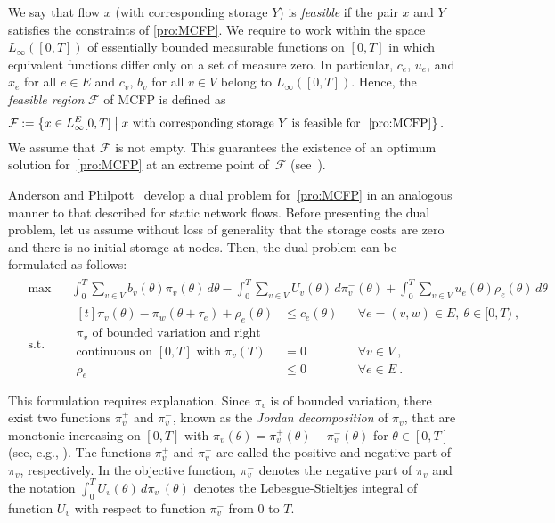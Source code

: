 \documentclass{svjour3}                     \smartqed
\begin{document}
We say that flow $x$ (with corresponding storage $Y$) is \emph{feasible} if the pair $x$ and $Y$ satisfies the constraints of \eqref{pro:MCFP}.
We require to work within the space $L_\infty([0,T])$ of essentially bounded measurable functions on $[0,T]$ in which equivalent functions differ only on a set of measure zero. In particular, $c_e$, $u_e$, and $x_e$ for all $e\in E$ and $c_v$, $b_v$ for all $v\in V$ belong to $L_\infty([0,T])$. Hence, the {\em feasible region} $\mathcal{F}$ of MCFP is defined as
\begin{align*}
\mathcal{F}&:=\left\{x\in L_\infty^{E}[0,T] \;\big|\; \text{$x$ with corresponding storage $Y$ is feasible for ~\eqref{pro:MCFP}} \right\}.
\end{align*}
We assume that $\mathcal{F}$ is not empty. This guarantees the existence of an optimum solution for~\eqref{pro:MCFP} at an
extreme point of~$\mathcal{F}$ (see~\cite[Theorem 3.1]{Pullan97}).


Anderson and Philpott~\cite{AndersonPhilpott94} develop a dual problem for~\eqref{pro:MCFP} in an analogous manner to that described for static network flows. Before presenting the dual problem, let us assume without loss of generality that the storage costs are zero and there is no initial storage at nodes. Then, the dual problem can be formulated as follows:
\begin{align}
\label{pro:MCFP*}
\tag{MCFP$^*$}
  \begin{aligned}
    &\max && \int_{0}^{T}\sum_{v\in V}b_v(\theta)\pi_v(\theta)\,d\theta-\int_{0}^{T}\sum_{v\in V}{U_v(\theta)\,d\pi_v^{-}(\theta)}+\int_{0}^{T}\sum_{v\in V}{u_e(\theta)\rho_e(\theta)}\,d\theta\\
    &\text{s.t.}
      &&\begin{aligned}[t]
        \pi_{v}(\theta)-\pi_w(\theta+\tau_e)+\rho_{e}(\theta)&\leq c_{e}(\theta) &&\forall e=(v,w)\in E,~\theta\in [0,T)~,\\
   \text{$\pi_v$ of bounded variation and right}&\\
  \text{continuous on $[0,T]$ with $\pi_v(T)$} &=0~&& \forall v\in V~,\\
       \rho_e &\leq 0 &&\forall e\in E~. \\
       \end{aligned}
  \end{aligned}
\end{align}
This formulation requires explanation. Since $\pi_v$ is of
bounded variation, there exist two functions $\pi_v^{+}$ and $\pi_v^{-}$, known as the \emph{Jordan decomposition} of $\pi_v$, that are monotonic increasing on $[0,T]$ with $\pi_v(\theta)=\pi_v^{+}(\theta)-\pi_v^{-}(\theta)$ for $\theta\in [0,T]$ (see, e.g., \cite[Chapter 6 ]{Apostol74}). The functions $\pi_v^{+}$ and $\pi_v^{-}$ are called the positive and negative part of $\pi_v$, respectively. In the objective function, $\pi_v^{-}$ denotes the negative part of $\pi_v$ and the notation $\int_{0}^{T}U_v(\theta)\,d\pi_v^{-}(\theta)$ denotes the Lebesgue-Stieltjes integral of function $U_v$ with respect to function $\pi_v^{-}$ from $0$ to $T$.
\end{document}
